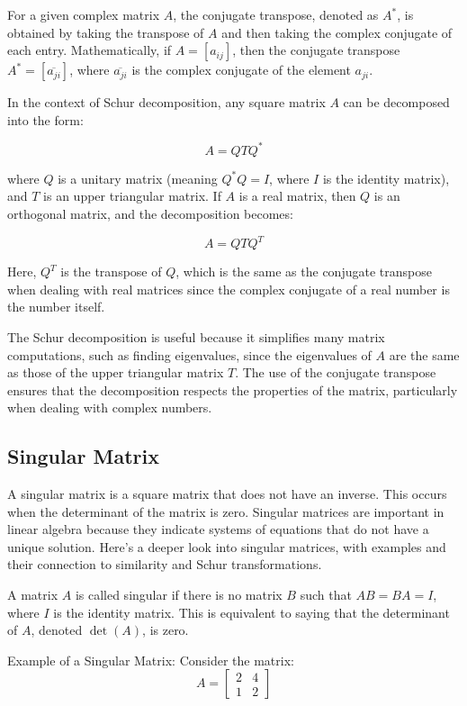 For a given complex matrix \( A \), the conjugate transpose, denoted as \( A^* \), is obtained by taking the transpose of \( A \) and then taking the complex conjugate of each entry. Mathematically, if \( A = [a_{ij}] \), then the conjugate transpose \( A^* = [\overline{a_{ji}}] \), where \( \overline{a_{ji}} \) is the complex conjugate of the element \( a_{ji} \).

In the context of Schur decomposition, any square matrix \( A \) can be decomposed into the form:

\[ A = Q T Q^* \]

where \( Q \) is a unitary matrix (meaning \( Q^* Q = I \), where \( I \) is the identity matrix), and \( T \) is an upper triangular matrix. If \( A \) is a real matrix, then \( Q \) is an orthogonal matrix, and the decomposition becomes:

\[ A = Q T Q^T \]

Here, \( Q^T \) is the transpose of \( Q \), which is the same as the conjugate transpose when dealing with real matrices since the complex conjugate of a real number is the number itself.

The Schur decomposition is useful because it simplifies many matrix computations, such as finding eigenvalues, since the eigenvalues of \( A \) are the same as those of the upper triangular matrix \( T \). The use of the conjugate transpose ensures that the decomposition respects the properties of the matrix, particularly when dealing with complex numbers.
\subsection{Singular Matrix}
A singular matrix is a square matrix that does not have an inverse. This occurs when the determinant of the matrix is zero. Singular matrices are important in linear algebra because they indicate systems of equations that do not have a unique solution. Here's a deeper look into singular matrices, with examples and their connection to similarity and Schur transformations.

\begin{definition}
A matrix \( A \) is called singular if there is no matrix \( B \) such that \( AB = BA = I \), where \( I \) is the identity matrix.
This is equivalent to saying that the determinant of \( A \), denoted \( \det(A) \), is zero.
\end{definition}
 

Example of a Singular Matrix:
Consider the matrix:
\[ 
A = \begin{bmatrix} 2 & 4 \\ 1 & 2 \end{bmatrix}
\]

